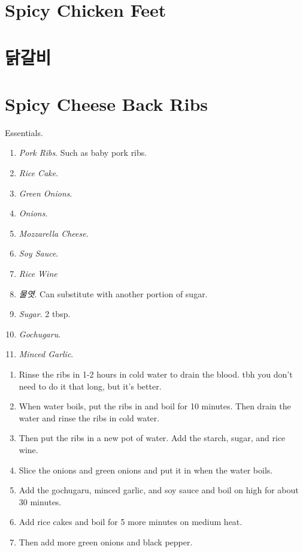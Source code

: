 \documentclass{article}
\begin{document}
\section{Spicy Chicken Feet} 

\section{닭갈비} 

\section{Spicy Cheese Back Ribs} 

  \begin{definition}
    Essentials. 
    \begin{enumerate}
      \item \textit{Pork Ribs}. Such as baby pork ribs. 
      \item \textit{Rice Cake}. 
      \item \textit{Green Onions}. 
      \item \textit{Onions}.
      \item \textit{Mozzarella Cheese}.  
      \item \textit{Soy Sauce}. 
      \item \textit{Rice Wine} 
      \item \textit{물엿}. Can substitute with another portion of sugar. 
      \item \textit{Sugar}. 2 tbsp. 
      \item \textit{Gochugaru}. 
      \item \textit{Minced Garlic}. 
    \end{enumerate}
  \end{definition}

  \begin{theorem}
    \begin{enumerate}
      \item Rinse the ribs in 1-2 hours in cold water to drain the blood. tbh you don't need to do it that long, but it's better. 
      \item When water boils, put the ribs in and boil for 10 minutes. Then drain the water and rinse the ribs in cold water. 
      \item Then put the ribs in a new pot of water. Add the starch, sugar, and rice wine. 
      \item Slice the onions and green onions and put it in when the water boils. 
      \item Add the gochugaru, minced garlic, and soy sauce and boil on high for about 30 minutes. 
      \item Add rice cakes and boil for 5 more minutes on medium heat.  
      \item Then add more green onions and black pepper. 
    \end{enumerate}
  \end{theorem}
\end{document}
